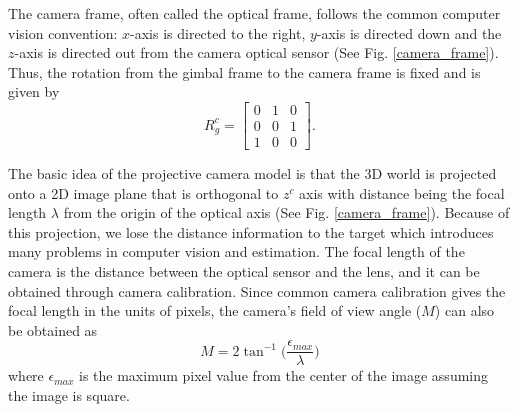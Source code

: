 The camera frame, often called the optical frame, follows the common computer vision convention: $x$-axis is directed to the right, $y$-axis is directed down and the $z$-axis is directed out from the camera optical sensor (See Fig. \ref{camera_frame}). Thus, the rotation from the gimbal frame to the camera frame is fixed and is given by 
\begin{equation}
R^{c}_g =
\begin{bmatrix}
0 & 1 & 0 \\
0 & 0 & 1 \\
1 & 0 & 0
\end{bmatrix}.
\label{eq4}
\end{equation}

The basic idea of the projective camera model is that the 3D world is projected onto a 2D image plane that is orthogonal to $z^c$ axis with distance being the focal length $\lambda$ from the origin of the optical axis (See Fig. \ref{camera_frame}). Because of this projection, we lose the distance information to the target which introduces many problems in computer vision and estimation. 
The focal length of the camera is the distance between the optical sensor and the lens, and it can be obtained through camera calibration. Since common camera calibration gives the focal length in the units of pixels, the camera's field of view angle ($M$) can also be obtained as
\begin{equation}
M=2\tan^{-1}\bigg(\frac{\epsilon_{max}}{\lambda}\bigg)
\end{equation}
where $\epsilon_{max}$ is the maximum pixel value from the center of the image assuming the image is square. 


